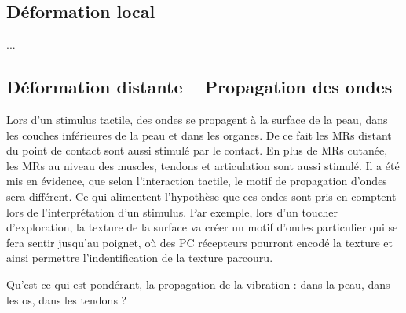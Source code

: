 \subsection{Déformation local}
...

\subsection{Déformation distante -- Propagation des ondes}
Lors d’un stimulus tactile, des ondes se propagent à la surface de la peau, dans les couches inférieures de la peau et dans les organes. De ce fait les MRs distant du point de contact sont aussi stimulé par le contact. En plus de MRs cutanée, les MRs au niveau des muscles, tendons et articulation sont aussi stimulé. Il a été mis en évidence, que selon l’interaction tactile, le motif de propagation d’ondes sera différent. Ce qui alimentent l’hypothèse que ces ondes sont pris en comptent lors de l’interprétation d’un stimulus. Par exemple, lors d’un toucher d’exploration, la texture de la surface va créer un motif d’ondes particulier qui se fera sentir jusqu’au poignet, où des PC récepteurs pourront encodé la texture et ainsi permettre l’indentification de la texture parcouru.\par

Qu’est ce qui est pondérant, la propagation de la vibration : dans la peau, dans les os, dans les tendons ?\par


